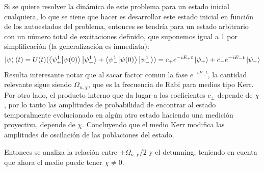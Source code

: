 Si se quiere resolver la dinámica de este problema para un estado inicial cualquiera, lo que se tiene que hacer es desarrollar este estado inicial en función de los autoestados del problema, entonces se tendría para un estado arbitrario con un número total de excitaciones definido, que suponemos igual a 1 por simplificación (la generalización es inmediata):
\begin{equation}
    \ket{\psi}(t)=U(t)(\braket{\psi_+^1}{\psi(0)}\ket{\psi_+^1}+\braket{\psi_-^1}{\psi(0)}\ket{\psi_-^1})=c_+e^{-iE_+t}\ket{\psi_+}+c_-e^{-iE_-t}\ket{\psi_-}
\end{equation}
Resulta interesante notar que al sacar factor comun la fase $e^{-iE_+t}$, la cantidad relevante sigue siendo $\Omega_{n,\chi}$, que es la frecuencia de Rabi para medios tipo Kerr. Por otro lado, el producto interno que da lugar a los coeficientes $c_\pm$ depende de $\chi$, por lo tanto las amplitudes de probabilidad de encontrar al estado temporalmente evolucionado en algún otro estado haciendo una medición proyectiva, depende de $\chi$. Concluyendo que el medio Kerr modifica las amplitudes de oscilación de las poblaciones del estado.

Entonces se analiza la relación entre $\pm \Omega_{n,\chi}/2$ y el detunning, teniendo en cuenta que ahora el medio puede tener $\chi \neq 0$. 

